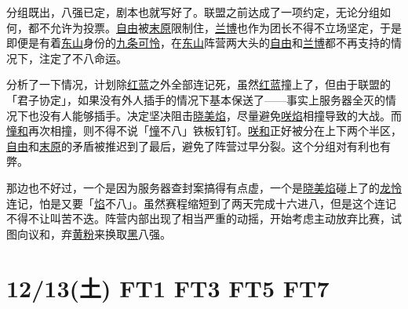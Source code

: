 分组既出，八强已定，剧本也就写好了。联盟之前达成了一项约定，无论分组如何，都不允许为投票。\uline{自由}被\uline{末原}限制住，\uline{兰博}也作为团长不得不立场坚定，于是即便是有着\uline{东山}身份的\uline{九条可怜}，在\uline{东山}阵营两大头的\uline{自由}和\uline{兰博}都不再支持的情况下，注定了不八命运。

分析了一下情况，计划除\uline{红蓝}之外全部连记死，虽然\uline{红蓝}撞上了，但由于联盟的「君子协定」，如果没有外人插手的情况下基本保送了——事实上服务器全灭的情况下也没有人能够插手。决定坚决阻击\uline{晓美焰}，尽量避免\uline{咲焰}相撞导致的大战。而\uline{憧和}再次相撞，则不得不说「\uline{憧}不八」铁板钉钉。\uline{咲和}正好被分在上下两个半区，\uline{自由}和\uline{末原}的矛盾被推迟到了最后，避免了阵营过早分裂。这个分组对有利也有弊。

那边也不好过，一个是因为服务器查封案搞得有点虚，一个是\uline{晓美焰}碰上了的\uline{龙怜}连记，怕是又要「\uline{焰}不八」。虽然赛程缩短到了两天完成十六进八，但是这个连记不得不让叫苦不迭。阵营内部出现了相当严重的动摇，开始考虑主动放弃比赛，试图向议和，弃\uline{黄粉}来换取\uline{黑}八强。

\section{12/13(土) FT1 FT3 FT5 FT7}


